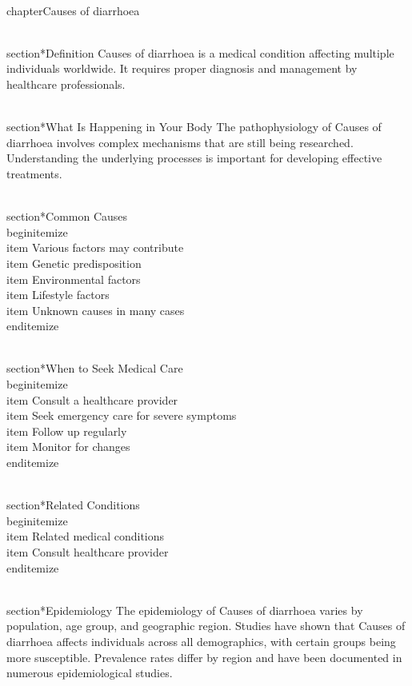 
\\chapter{Causes of diarrhoea}

\\section*{Definition}
Causes of diarrhoea is a medical condition affecting multiple individuals worldwide. It requires proper diagnosis and management by healthcare professionals.

\\section*{What Is Happening in Your Body}
The pathophysiology of Causes of diarrhoea involves complex mechanisms that are still being researched. Understanding the underlying processes is important for developing effective treatments.

\\section*{Common Causes}
\\begin{itemize}
\\item Various factors may contribute\n  \\item Genetic predisposition\n  \\item Environmental factors\n  \\item Lifestyle factors\n  \\item Unknown causes in many cases
\\end{itemize}

\\section*{When to Seek Medical Care}
\\begin{itemize}
\\item Consult a healthcare provider\n  \\item Seek emergency care for severe symptoms\n  \\item Follow up regularly\n  \\item Monitor for changes
\\end{itemize}

\\section*{Related Conditions}
\\begin{itemize}
\\item Related medical conditions\n  \\item Consult healthcare provider
\\end{itemize}

\\section*{Epidemiology}
The epidemiology of Causes of diarrhoea varies by population, age group, and geographic region. Studies have shown that Causes of diarrhoea affects individuals across all demographics, with certain groups being more susceptible. Prevalence rates differ by region and have been documented in numerous epidemiological studies.

